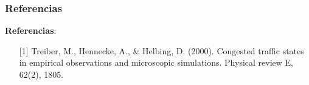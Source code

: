 \documentclass[10pt, compress]{beamer}
\begin{document}
\begin{frame}[fragile]

\frametitle{Referencias}

\textbf{Referencias}:
\begin{itemize}
\item [{[1]}] Treiber, M., Hennecke, A., \& Helbing, D. (2000). Congested traffic states in empirical observations and microscopic simulations. Physical review E, 62(2), 1805.
\end{itemize}
 
\end{frame}
\end{document}
